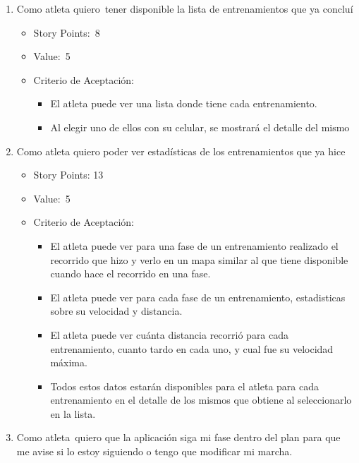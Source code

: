 \begin{enumerate}
\def\labelenumi{\arabic{enumi})}
\item
  Como atleta quiero~tener disponible la lista de entrenamientos que ya
  concluí

  \begin{itemize}
  \item
    Story Points:~8
  \item
    Value:~5
  \item
    Criterio de Aceptación:

    \begin{itemize}
    \itemsep1pt\parskip0pt
    \item
      El atleta puede ver una lista donde tiene cada entrenamiento.
    \item
      Al elegir uno de ellos con su celular, se mostrará el detalle del
      mismo
    \end{itemize}
  \end{itemize}
\item
  Como atleta quiero poder ver estadísticas de los entrenamientos que ya
  hice

  \begin{itemize}
  \item
    Story Points: 13
  \item
    Value:~5
  \item
    Criterio de Aceptación:

    \begin{itemize}
    \item
      El atleta puede ver para una fase de un entrenamiento realizado el
      recorrido que hizo y verlo en un mapa similar al que tiene
      disponible cuando hace el recorrido en una fase.
    \item
      El atleta puede ver para cada fase de un entrenamiento,
      estadisticas sobre su velocidad y distancia.
    \item
      El atleta puede ver cuánta distancia recorrió para cada
      entrenamiento, cuanto tardo en cada uno, y cual fue su velocidad
      máxima.
    \item
      Todos estos datos estarán disponibles para el atleta para cada
      entrenamiento en el detalle de los mismos que obtiene al
      seleccionarlo en la lista.
    \end{itemize}
  \end{itemize}
\item
  Como atleta~quiero que la aplicación siga mi fase dentro del plan para
  que me avise si lo estoy siguiendo o tengo que modificar mi marcha.


\end{enumerate}
